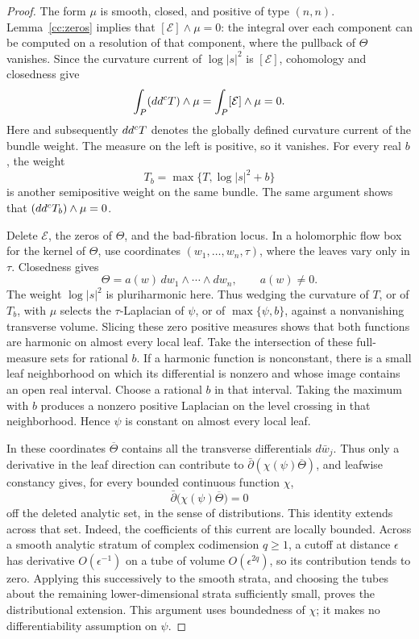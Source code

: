 \begin{proof}
The form \(\mu\) is smooth, closed, and positive of type \((n,n)\).
Lemma~\ref{cc:zeros} implies that
\([\mathcal E]\wedge\mu=0\): the integral over each component can be
computed on a resolution of that component, where the pullback of
\(\Theta\) vanishes.  Since the curvature current of
\(\log|s|^2\) is \([\mathcal E]\), cohomology and closedness give
\[
 \int_P (dd^c T)\wedge\mu
    =\int_P[\mathcal E]\wedge\mu=0.
\]
Here and subsequently \(dd^c T\) denotes the globally defined curvature
current of the bundle weight.  The measure on the left is positive,
so it vanishes.  For every real \(b\), the weight
\[
 T_b=\max\{T,\log|s|^2+b\}
\]
is another semipositive weight on the same bundle.  The same argument
shows that \((dd^c T_b)\wedge\mu=0\).

Delete \(\mathcal E\), the zeros of \(\Theta\), and the bad-fibration
locus.  In a holomorphic flow box for the kernel of \(\Theta\), use
coordinates \((w_1,\ldots,w_n,\tau)\), where the leaves vary only in
\(\tau\).  Closedness gives
\[
 \Theta=a(w)\,dw_1\wedge\cdots\wedge dw_n,
 \qquad a(w)\ne0.
\]
The weight \(\log|s|^2\) is pluriharmonic here.  Thus wedging the
curvature of \(T\), or of \(T_b\), with \(\mu\) selects the
\(\tau\)-Laplacian of \(\psi\), or of \(\max\{\psi,b\}\), against
a nonvanishing transverse volume.  Slicing these zero positive
measures shows that both functions are harmonic on almost every
local leaf.  Take the intersection of these full-measure sets for
rational \(b\).  If a harmonic function is nonconstant, there is a
small leaf neighborhood on which its differential is nonzero and
whose image contains an open real interval.  Choose a rational
\(b\) in that interval.  Taking the maximum with \(b\) produces a
nonzero positive Laplacian on the level crossing in that
neighborhood.  Hence \(\psi\) is constant on almost every local
leaf.

In these coordinates $\overline\Theta$ contains all the transverse
differentials $d\bar w_j$. Thus only a derivative in the leaf
direction can contribute to
$\bar\partial(\chi(\psi)\overline\Theta)$, and leafwise constancy
gives, for every bounded continuous function \(\chi\),
\[
 \bar\partial\bigl(\chi(\psi)\overline\Theta\bigr)=0
\]
off the deleted analytic set, in the sense of distributions.  This
identity extends across that set.  Indeed, the coefficients of this
current are locally bounded.  Across a smooth analytic stratum of
complex codimension \(q\geq1\), a cutoff at distance \(\epsilon\)
has derivative \(O(\epsilon^{-1})\) on a tube of volume
\(O(\epsilon^{2q})\), so its contribution tends to zero.  Applying
this successively to the smooth strata, and choosing the tubes about
the remaining lower-dimensional strata sufficiently small, proves
the distributional extension.  This argument uses boundedness of
\(\chi\); it makes no differentiability assumption on \(\psi\).


\end{proof}
